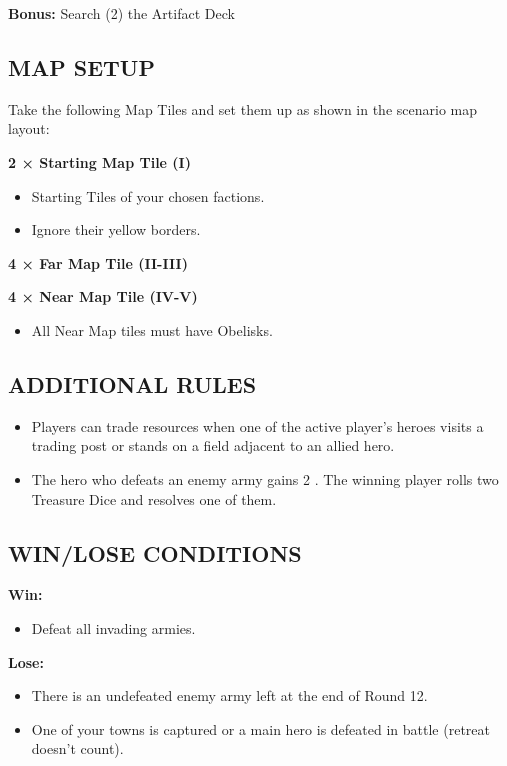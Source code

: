\begin{multicols*}{2}
\textbf{Bonus:} Search (2) the Artifact Deck

\subsection*{\MakeUppercase{Map Setup}}

Take the following Map Tiles and set them up as shown in the scenario map layout:

\textbf{2 × Starting Map Tile (I)}
\begin{itemize}
  \item Starting Tiles of your chosen factions.
  \item Ignore their yellow borders.
\end{itemize}

\textbf{4 × Far Map Tile (II-III)}

\textbf{4 × Near Map Tile (IV-V)}
\begin{itemize}
  \item All Near Map tiles must have Obelisks.
\end{itemize}

\subsection*{\MakeUppercase{Additional rules}}

\begin{itemize}
  \item Players can trade resources when one of the active player's heroes visits a trading post or stands on a field adjacent to an allied hero.
  \item The hero who defeats an enemy army gains 2 .
    The winning player rolls two Treasure Dice and resolves one of them.
\end{itemize}

\subsection*{\MakeUppercase{Win/lose conditions}}

\textbf{Win:}
\begin{itemize}
  \item Defeat all invading armies.
\end{itemize}

\textbf{Lose:}
\begin{itemize}
  \item There is an undefeated enemy army left at the end of Round 12.
  \item One of your towns is captured or a main hero is defeated in battle
  (retreat doesn't count).
\end{itemize}


\end{multicols*}
